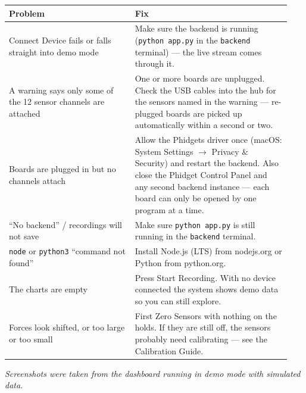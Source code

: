 \documentclass[11pt,a4paper]{article}
\begin{document}
\begin{center}
\begin{tabular}{@{}p{0.42\linewidth}p{0.52\linewidth}@{}}
\toprule
\textbf{Problem} & \textbf{Fix} \\
\midrule
\textsf{Connect Device} fails or falls straight into demo mode &
Make sure the backend is running (\texttt{python app.py} in the \texttt{backend}
terminal) --- the live stream comes through it. \\[4pt]
A warning says only some of the 12 sensor channels are attached &
One or more boards are unplugged. Check the USB cables into the hub for the
sensors named in the warning --- re-plugged boards are picked up automatically
within a second or two. \\[4pt]
Boards are plugged in but no channels attach &
Allow the Phidgets driver once (macOS: \textsf{System Settings $\rightarrow$
Privacy \& Security}) and restart the backend. Also close the Phidget Control
Panel and any second backend instance --- each board can only be opened by one
program at a time. \\[4pt]
``No backend'' / recordings will not save &
Make sure \texttt{python app.py} is still running in the \texttt{backend} terminal. \\[4pt]
\texttt{node} or \texttt{python3} ``command not found'' &
Install Node.js (LTS) from nodejs.org or Python from python.org. \\[4pt]
The charts are empty &
Press \textsf{Start Recording}. With no device connected the system shows demo
data so you can still explore. \\[4pt]
Forces look shifted, or too large or too small &
First \textsf{Zero Sensors} with nothing on the holds. If they are still off, the
sensors probably need calibrating --- see the Calibration Guide. \\
\bottomrule
\end{tabular}
\end{center}

\vfill
\begin{center}\small\itshape\color{muted}
Screenshots were taken from the dashboard running in demo mode with simulated data.
\end{center}
\end{document}
